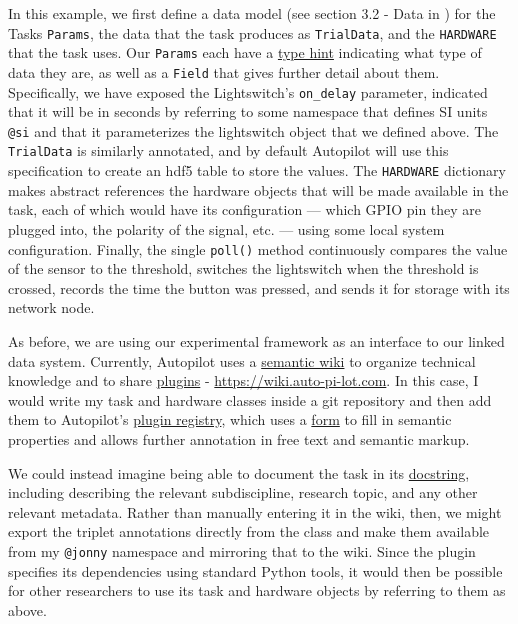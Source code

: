 In this example, we first define a data model (see section 3.2 - Data in
\citep{saundersAUTOPILOTAutomatingExperiments2022} ) for the Tasks
\texttt{Params}, the data that the task produces as \texttt{TrialData},
and the \texttt{HARDWARE} that the task uses. Our \texttt{Params} each
have a \href{https://peps.python.org/pep-0483/}{type hint} indicating
what type of data they are, as well as a \texttt{Field} that gives
further detail about them. Specifically, we have exposed the
Lightswitch's \texttt{on\_delay} parameter, indicated that it will be in
seconds by referring to some namespace that defines SI units
\texttt{@si} and that it parameterizes the lightswitch object that we
defined above. The \texttt{TrialData} is similarly annotated, and by
default Autopilot will use this specification to create an hdf5 table to
store the values. The \texttt{HARDWARE} dictionary makes abstract
references the hardware objects that will be made available in the task,
each of which would have its configuration --- which GPIO pin they are
plugged into, the polarity of the signal, etc. --- using some local
system configuration. Finally, the single \texttt{poll()} method
continuously compares the value of the sensor to the threshold, switches
the lightswitch when the threshold is crossed, records the time the
button was pressed, and sends it for storage with its network node.

As before, we are using our experimental framework as an interface to
our linked data system. Currently, Autopilot uses a
\href{https://www.semantic-mediawiki.org/wiki/Semantic_MediaWiki}{semantic
wiki} to organize technical knowledge and to share
\href{https://docs.auto-pi-lot.com/en/latest/guide/plugins.html}{plugins}
- \url{https://wiki.auto-pi-lot.com}. In this case, I would write my
task and hardware classes inside a git repository and then add them to
Autopilot's
\href{https://wiki.auto-pi-lot.com/index.php/Autopilot_Plugins}{plugin
registry}, which uses a
\href{https://wiki.auto-pi-lot.com/index.php/Form:Autopilot_Plugin}{form}
to fill in semantic properties and allows further annotation in free
text and semantic markup.

We could instead imagine being able to document the task in its
\href{https://peps.python.org/pep-0257/}{docstring}, including
describing the relevant subdiscipline, research topic, and any other
relevant metadata. Rather than manually entering it in the wiki, then,
we might export the triplet annotations directly from the class and make
them available from my \texttt{@jonny} namespace and mirroring that to
the wiki. Since the plugin specifies its dependencies using standard
Python tools, it would then be possible for other researchers to use its
task and hardware objects by referring to them as above.

